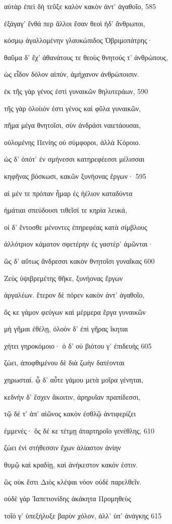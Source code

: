 αὐτὰρ ἐπεὶ δὴ τεῦξε καλὸν κακὸν ἀντ' ἀγαθοῖο, 585 

ἐξάγαγ' ἔνθά περ ἄλλοι ἔσαν θεοὶ ἠδ' ἄνθρωποι,

κόσμῳ ἀγαλλομένην γλαυκώπιδος Ὀβριμοπάτρης· 

θαῦμα δ' ἔχ' ἀθανάτους τε θεοὺς θνητούς τ' ἀνθρώπους,

ὡς εἶδον δόλον αἰπύν, ἀμήχανον ἀνθρώποισιν.

ἐκ τῆς γὰρ γένος ἐστὶ γυναικῶν θηλυτεράων, 590

τῆς γὰρ ὀλοίιόν ἐστι γένος καὶ φῦλα γυναικῶν,

πῆμα μέγα θνητοῖσι, σὺν ἀνδράσι ναιετάουσαι,

οὐλομένης Πενίης οὐ σύμφοροι, ἀλλὰ Κόροιο.

ὡς δ' ὁπότ' ἐν σμήνεσσι κατηρεφέεσσι μέλισσαι

κηφῆνας βόσκωσι, κακῶν ξυνήονας ἔργων· 595

αἱ μέν τε πρόπαν ἦμαρ ἐς ἠέλιον καταδύντα

ἠμάτιαι σπεύδουσι τιθεῖσί τε κηρία λευκά,

οἱ δ' ἔντοσθε μένοντες ἐπηρεφέας κατὰ σίμβλους 

ἀλλότριον κάματον σφετέρην ἐς γαστέρ' ἀμῶνται· 

ὣς δ' αὔτως ἄνδρεσσι κακὸν θνητοῖσι γυναῖκας 600

Ζεὺς ὑψιβρεμέτης θῆκε, ξυνήονας ἔργων

ἀργαλέων. ἕτερον δὲ πόρεν κακὸν ἀντ' ἀγαθοῖο,

ὅς κε γάμον φεύγων καὶ μέρμερα ἔργα γυναικῶν

μὴ γῆμαι ἐθέλῃ, ὀλοὸν δ' ἐπὶ γῆρας ἵκηται

χήτει γηροκόμοιο· ὁ δ' οὐ βιότου γ' ἐπιδευὴς 605 

ζώει, ἀποφθιμένου δὲ διὰ ζωὴν δατέονται

χηρωσταί. ᾧ δ' αὖτε γάμου μετὰ μοῖρα γένηται, 

κεδνὴν δ' ἔσχεν ἄκοιτιν, ἀρηρυῖαν πραπίδεσσι, 

τῷ δέ τ' ἀπ' αἰῶνος κακὸν ἐσθλῷ ἀντιφερίζει

ἐμμενές· ὃς δέ κε τέτμῃ ἀταρτηροῖο γενέθλης, 610 

ζώει ἐνὶ στήθεσσιν ἔχων ἀλίαστον ἀνίην

θυμῷ καὶ κραδίῃ, καὶ ἀνήκεστον κακόν ἐστιν.

ὣς οὐκ ἔστι Διὸς κλέψαι νόον οὐδὲ παρελθεῖν.

οὐδὲ γὰρ Ἰαπετιονίδης ἀκάκητα Προμηθεὺς

τοῖό γ' ὑπεξήλυξε βαρὺν χόλον, ἀλλ' ὑπ' ἀνάγκης 615

